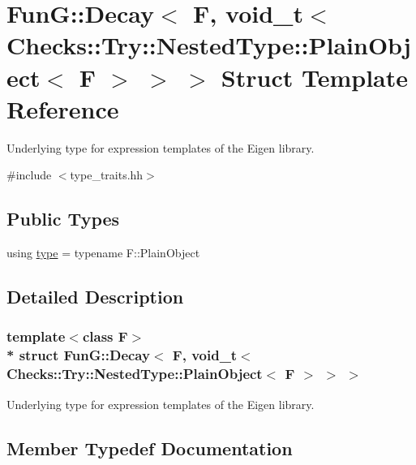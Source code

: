 \hypertarget{structFunG_1_1Decay_3_01F_00_01void__t_3_01Checks_1_1Try_1_1NestedType_1_1PlainObject_3_01F_01_4_01_4_01_4}{}\section{FunG\+:\+:Decay$<$ F, void\+\_\+t$<$ Checks\+:\+:Try\+:\+:Nested\+Type\+:\+:Plain\+Object$<$ F $>$ $>$ $>$ Struct Template Reference}
\label{structFunG_1_1Decay_3_01F_00_01void__t_3_01Checks_1_1Try_1_1NestedType_1_1PlainObject_3_01F_01_4_01_4_01_4}


Underlying type for expression templates of the Eigen library.  




{\ttfamily \#include $<$type\+\_\+traits.\+hh$>$}

\subsection*{Public Types}
\begin{DoxyCompactItemize}
\item 
using \hyperlink{structFunG_1_1Decay_3_01F_00_01void__t_3_01Checks_1_1Try_1_1NestedType_1_1PlainObject_3_01F_01_4_01_4_01_4_a27b32af38cd1fb109944b71825771648}{type} = typename F\+::\+Plain\+Object
\end{DoxyCompactItemize}


\subsection{Detailed Description}
\subsubsection*{template$<$class F$>$\\*
struct Fun\+G\+::\+Decay$<$ F, void\+\_\+t$<$ Checks\+::\+Try\+::\+Nested\+Type\+::\+Plain\+Object$<$ F $>$ $>$ $>$}

Underlying type for expression templates of the Eigen library. 

\subsection{Member Typedef Documentation}
